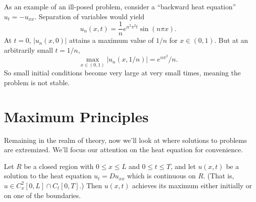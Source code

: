 \documentclass[../m180main.tex]{subfiles}
\begin{document}
As an example of an ill-posed problem, consider a ``backward heat equation'' $u_t = -u_{xx}$.
Separation of variables would yield \vspace{-5pt}
\[ u_n(x,t) = \frac{1}{n} e^{n^2 \pi^2 t} \sin(n\pi x). \]
At $t=0$, $|u_n(x,0)|$ attains a maximum value of $1 / n$ for $x \in (0,1)$.
But at an arbitrarily small $t = 1 / n$,
\[ \max_{x \in (0,1)} \left| u_n(x , 1 / n) \right| = e^{n\pi^2} / n. \]
So small initial conditions become very large at very small times, meaning the problem is not stable.

\section{Maximum Principles}
Remaining in the realm of theory, now we'll look at where solutions to problems are extremized.
We'll focus our attention on the heat equation for convenience.

\begin{theorem}
    Let $R$ be a closed region with $0 \leq x \leq L$ and $0 \leq t \leq T$, and let $u(x,t)$ be a solution to the heat equation $u_t = Du_{xx}$ which is continuous on $R$.
    (That is, $u \in C_x^2[0,L] \cap C_t[0,T]$.)
    Then $u(x,t)$ achieves its maximum either initially or on one of the boundaries.
\end{theorem}
\end{document}
